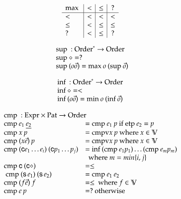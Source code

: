 \begin{definition}
\[
\begin{array}{l | c |c | c}
 \mathrm{max}\: & <      &  \leq    &   ? \\
\hline
  <    & <       & <       &   <    \\
 \leq  & <       & \leq    &   \leq  \\
 ?     & <       & \leq    &   ?
\end{array}
\]
\end{definition}

\begin{definition}
\[
\begin{array}[t]{ll}
\multicolumn{2}{l}{\supo : \ves{\order} \ra \order}\\ 
\supo \diamond = ? \\
\supo (o \vec{o} ) = \maxo o \: (\supo \vec{o}) \\
\end{array}
\]
\end{definition}

\begin{definition}
\[
\begin{array}[t]{ll}
\multicolumn{2}{l}{\info : \ves{\order} \ra \order}\\ 
\info \diamond = < \\
\info (o \vec{o} ) = \mino o \: (\info \vec{o}) \\
\end{array}
\]
\end{definition}

\newcommand{\cmp}{\mathrm{cmp}\:}
\newcommand{\cmpv}{\mathrm{cmpv}}
\newcommand{\cmps}{\mathrm{cmps}}
\newcommand{\cmpsv}{\mathrm{cmpsv}}
\newcommand{\etp}{\mathrm{etp}\:}


\[
\begin{array}[t]{ll}
\multicolumn{2}{l}{\cmp : \Expr \times \Pat \ra \order}\\ 
\cmp e_1 \: \inacc{e_2} & = \cmp e_1 \: p \mbox{ if } \etp e_2 = p \\
\cmp x \: p & = \cmpv x \:p  \mbox{ where } x \in \cV \\
\cmp (x \vec{e}) \: p & = \cmpv x \:p  \mbox{ where } x \in \cV \\
\cmp (\cc e_1 \ldots e_i) \: (\cc p_1 \ldots p_j ) & = \info (\cmp e_1 p_1) \ldots (\cmp e_m p_m)\\
& \: \mbox { where } m = min\{i,j\}\\ 
\cmp \cc \: (\cc \diamond) & = \leq \\\
\cmp (\s e_1) \: (\s e_2) & = \cmp e_1 \: e_2 \\
\cmp (f \vec{e}) \: f & = \leq \mbox{ where } f \in \cV \\
\cmp e \: p & = ? \mbox{ otherwise}
\end{array}
\]

